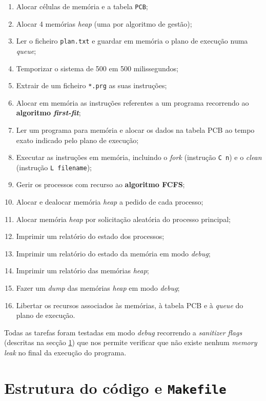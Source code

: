 \documentclass[10pt,oneside]{estiloUBI}
\begin{document}
	\begin{enumerate}
		\item Alocar células de memória e a tabela \texttt{\ac{PCB}};
		\item Alocar 4 memórias \textit{heap} (uma por algoritmo de gestão);
		\item Ler o ficheiro \texttt{plan.txt} e guardar em memória o plano de execução numa \textit{queue};
		\item Temporizar o sistema de 500 em 500 milissegundos;
		\item Extrair de um ficheiro \texttt{*.prg} as suas instruções;
		\item Alocar em memória as instruções referentes a um programa recorrendo ao \textbf{algoritmo \textit{first-fit}};
		\item Ler um programa para memória e alocar os dados na tabela \ac{PCB} ao tempo exato indicado pelo plano de execução;
		\item Executar as instruções em memória, incluindo o \textit{fork} (instrução \verb|C n|) e o \textit{clean} (instrução \verb|L filename|);
		\item Gerir os processos com recurso ao \textbf{algoritmo \ac{FCFS}};
		\item Alocar e dealocar memória \textit{heap} a pedido de cada processo;
		\item Alocar memória \textit{heap} por solicitação aleatória do processo principal;
		\item Imprimir um relatório do estado dos processos;
		\item Imprimir um relatório do estado da memória em modo \textit{debug};
		\item Imprimir um relatório das memórias \textit{heap};
		\item Fazer um \textit{dump} das memórias \textit{heap} em modo \textit{debug};
		\item Libertar os recursos associados às memórias, à tabela \ac{PCB} e à \textit{queue} do plano de execução.
	\end{enumerate}
	
	Todas as tarefas foram testadas em modo \textit{debug} recorrendo a \textit{sanitizer flags} (descritas na secção \ref{ssec:dev:struct_makefile}) que nos permite verificar que não existe nenhum \textit{memory leak} no final da execução do programa.
	
	
	\section{Estrutura do código e \texttt{Makefile}}
	\label{ssec:dev:struct_makefile}
	
\end{document}

